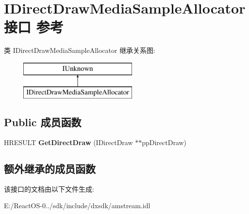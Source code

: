 \hypertarget{interface_i_direct_draw_media_sample_allocator}{}\section{I\+Direct\+Draw\+Media\+Sample\+Allocator接口 参考}
\label{interface_i_direct_draw_media_sample_allocator}
类 I\+Direct\+Draw\+Media\+Sample\+Allocator 继承关系图\+:\begin{figure}[H]
\begin{center}
\leavevmode
\includegraphics[height=2.000000cm]{interface_i_direct_draw_media_sample_allocator}
\end{center}
\end{figure}
\subsection*{Public 成员函数}
\begin{DoxyCompactItemize}
\item 
\mbox{\label{interface_i_direct_draw_media_sample_allocator_aaa0da11586d75fa70113f1f2c1cbcb1c}} 
H\+R\+E\+S\+U\+LT {\bfseries Get\+Direct\+Draw} (I\+Direct\+Draw $\ast$$\ast$pp\+Direct\+Draw)
\end{DoxyCompactItemize}
\subsection*{额外继承的成员函数}


该接口的文档由以下文件生成\+:\begin{DoxyCompactItemize}
\item 
E\+:/\+React\+O\+S-\/0../sdk/include/dxsdk/amstream.\+idl\end{DoxyCompactItemize}

